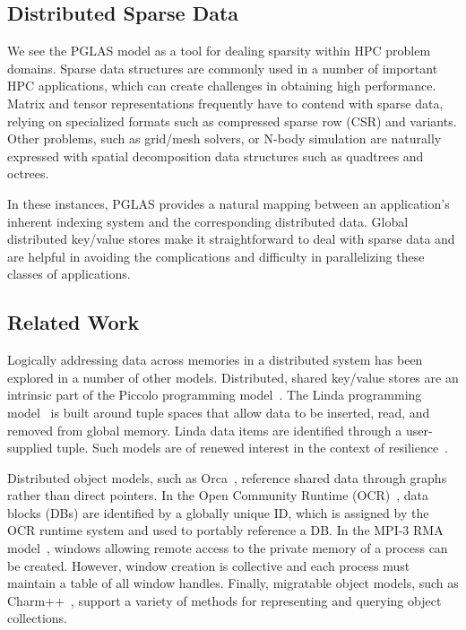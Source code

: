\subsection{Distributed Sparse Data}

We see the PGLAS model as a tool for dealing sparsity within HPC problem domains.  
Sparse data structures are commonly used in a number of important HPC 
applications, which can create challenges in obtaining high performance. Matrix 
and tensor representations frequently have to contend with sparse data, 
relying on specialized formats such as compressed sparse row (CSR) and variants.  
Other problems, such as grid/mesh solvers, or N-body simulation are naturally 
expressed with spatial decomposition data structures such as quadtrees and 
octrees. 

In these instances, PGLAS provides a natural mapping between an application's 
inherent indexing system and the corresponding distributed data. Global 
distributed key/value stores make it straightforward to deal with sparse data 
and are helpful in avoiding the complications and difficulty in parallelizing 
these classes of applications.

\subsection{Related Work} 

Logically addressing data across memories in a distributed
system has been explored in a number of other models.  Distributed,
shared key/value stores are an intrinsic part of the Piccolo
programming model~\cite{power:10}. The Linda programming
model~\cite{ahuja:86} is built around tuple spaces that allow data
to be inserted, read, and removed from global memory. Linda data items
are identified through a user-supplied tuple. Such models are of
renewed interest in the context of resilience~\cite{wilke:14}.

Distributed object models, such as Orca~\cite{bal:92}, reference
shared data through graphs rather than direct pointers.  In the Open
Community Runtime (OCR)~\cite{OCR}, data blocks (DBs) are identified
by a globally unique ID, which is assigned by the OCR runtime system
and used to portably reference a DB.  In the MPI-3 RMA 
model~\cite{mpi-forum:15}, windows allowing remote
access to the private memory of a process can be created.  However,
window creation is collective and each process must maintain a table of
all window handles.  Finally, migratable object
models, such as Charm++~\cite{kale:93}, support a variety of methods
for representing and querying object collections.

